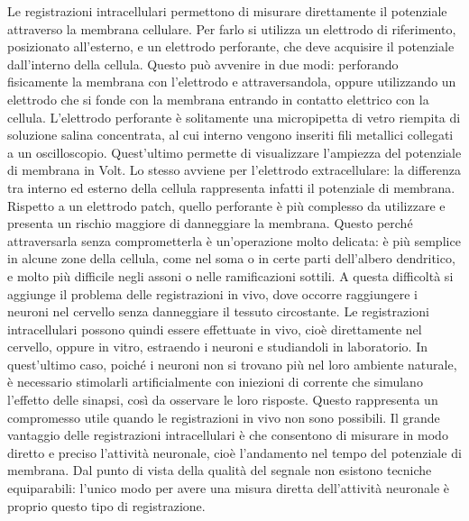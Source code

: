 \documentclass[12pt,a4paper,openany]{book}
\begin{document}
Le registrazioni intracellulari permettono di misurare direttamente il potenziale attraverso la membrana cellulare. Per farlo si utilizza un elettrodo di riferimento, posizionato all’esterno, e un elettrodo perforante, che deve acquisire il potenziale dall’interno della cellula. Questo può avvenire in due modi: perforando fisicamente la membrana con l’elettrodo e attraversandola, oppure utilizzando un elettrodo che si fonde con la membrana entrando in contatto elettrico con la cellula. L’elettrodo perforante è solitamente una micropipetta di vetro riempita di soluzione salina concentrata, al cui interno vengono inseriti fili metallici collegati a un oscilloscopio. Quest’ultimo permette di visualizzare l’ampiezza del potenziale di membrana in Volt. Lo stesso avviene per l’elettrodo extracellulare: la differenza tra interno ed esterno della cellula rappresenta infatti il potenziale di membrana. Rispetto a un elettrodo patch, quello perforante è più complesso da utilizzare e presenta un rischio maggiore di danneggiare la membrana. Questo perché attraversarla senza comprometterla è un’operazione molto delicata: è più semplice in alcune zone della cellula, come nel soma o in certe parti dell’albero dendritico, e molto più difficile negli assoni o nelle ramificazioni sottili. A questa difficoltà si aggiunge il problema delle registrazioni in vivo, dove occorre raggiungere i neuroni nel cervello senza danneggiare il tessuto circostante. Le registrazioni intracellulari possono quindi essere effettuate in vivo, cioè direttamente nel cervello, oppure in vitro, estraendo i neuroni e studiandoli in laboratorio. In quest’ultimo caso, poiché i neuroni non si trovano più nel loro ambiente naturale, è necessario stimolarli artificialmente con iniezioni di corrente che simulano l’effetto delle sinapsi, così da osservare le loro risposte. Questo rappresenta un compromesso utile quando le registrazioni in vivo non sono possibili.
Il grande vantaggio delle registrazioni intracellulari è che consentono di misurare in modo diretto e preciso l’attività neuronale, cioè l’andamento nel tempo del potenziale di membrana. Dal punto di vista della qualità del segnale non esistono tecniche equiparabili: l’unico modo per avere una misura diretta dell’attività neuronale è proprio questo tipo di registrazione.
\end{document}
